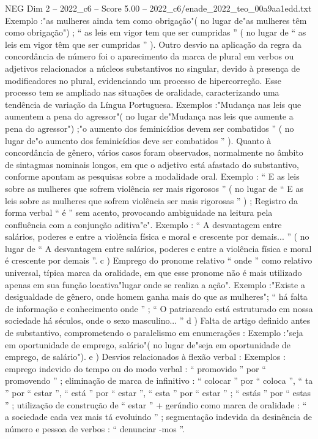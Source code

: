 \begin{textsample}{NEG Dim 2 – 2022\_c6 – Score 5.00 – 2022\_c6/enade\_2022\_teo\_00a9aa1edd.txt}
Exemplo :"as mulheres ainda tem como obrigação"( no lugar de"as mulheres têm como obrigação") ; “ as leis em vigor tem que ser cumpridas ” ( no lugar de “ as leis em vigor têm que ser cumpridas ” ).
Outro desvio na aplicação da regra da concordância de número foi o aparecimento da marca de plural em verbos ou adjetivos relacionados a núcleos substantivos no singular, devido à presença de modificadores no plural, evidenciando um processo de hipercorreção.
Esse processo tem se ampliado nas situações de oralidade, caracterizando uma tendência de variação da Língua Portuguesa.
Exemplos :"Mudança nas leis que aumentem a pena do agressor"( no lugar de"Mudança nas leis que aumente a pena do agressor") ;"o aumento dos feminicídios devem ser combatidos ” ( no lugar de"o aumento dos feminicídios deve ser combatidos ” ).
Quanto à concordância de gênero, vários casos foram observados, normalmente no âmbito de sintagmas nominais longos, em que o adjetivo está afastado do substantivo, conforme apontam as pesquisas sobre a modalidade oral.
Exemplo : “ E as leis sobre as mulheres que sofrem violência ser mais rigorosos ” ( no lugar de “ E as leis sobre as mulheres que sofrem violência ser mais rigorosas ” ) ; Registro da forma verbal “ é ” sem acento, provocando ambiguidade na leitura pela confluência com a conjunção aditiva"e".
Exemplo : “ A desvantagem entre salários, poderes e entre a violência física e moral e crescente por demais... ” ( no lugar de “ A desvantagem entre salários, poderes e entre a violência física e moral é crescente por demais ”. c ) Emprego do pronome relativo “ onde ” como relativo universal, típica marca da oralidade, em que esse pronome não é mais utilizado apenas em sua função locativa"lugar onde se realiza a ação".
Exemplo :"Existe a desigualdade de gênero, onde homem ganha mais do que as mulheres"; “ há falta de informação e conhecimento onde ” ; “ O patriarcado está estruturado em nossa sociedade há séculos, onde o sexo masculino... ” d ) Falta de artigo definido antes de substantivo, comprometendo o paralelismo em enumerações : Exemplo :"seja em oportunidade de emprego, salário"( no lugar de"seja em oportunidade de emprego, de salário"). e ) Desvios relacionados à flexão verbal : Exemplos : emprego indevido do tempo ou do modo verbal : “ promovido ” por “ promovendo ” ; eliminação de marca de infinitivo : “ colocar ” por “ coloca ”, “ ta ” por “ estar ”, “ está ” por “ estar ”, “ esta ” por “ estar ” ; “ estás ” por “ estas ” ; utilização de construção de “ estar ” + gerúndio como marca de oralidade : “ a sociedade cada vez mais tá evoluindo ” ; segmentação indevida da desinência de número e pessoa de verbos : “ denunciar -mos ”.

\end{textsample}
